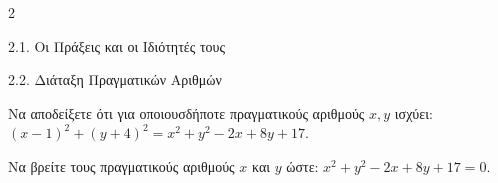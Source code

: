 \begin{ylh}{2}
    \item 2.1. Οι Πράξεις και οι Ιδιότητές τους
    \item 2.2. Διάταξη Πραγματικών Αριθμών
\end{ylh}

\begin{alist}
\item Να αποδείξετε ότι για οποιουσδήποτε πραγματικούς αριθμούς $x, y$ ισχύει: $(x-1)^2 + (y+4)^2 = x^2 + y^2 - 2x + 8y + 17$.
\item Να βρείτε τους πραγματικούς αριθμούς $x$ και $y$ ώστε: $x^2 + y^2 - 2x + 8y + 17 = 0$.
\end{alist}

